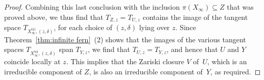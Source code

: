 \documentclass[11pt]{article}
\theoremstyle{definition}
\newcommand\tri{\mathrm{tri}}
\begin{document}
\begin{proof}
Combining this last conclusion with the inclusion
$\pi(X_{\infty}) \subseteq Z$ that was proved above,
we thus find that $T_{Z,z} = T_{U,z}$ contains
the image of the tangent space $T_{X^{\tri}_{\infty},(z,\delta)}$,
for each
choice of $(z,\delta)$ lying over $z$.
Since Theorem~\ref{thm:infinite fern}~(2) shows that
the images of the various tangent spaces $T_{X^{\tri}_{\infty},(z,\delta)}$
span $T_{Y,z}$,
we find that $T_{U,z} = T_{Y,z}$, and hence that $U$ and $Y$ coincide
locally at $z$. This implies that the Zariski closure
$V$ of~$U$, which is an irreducible component of $Z$, is also
an irreducible component of~$Y$, as required.
\end{proof}

\vspace*{-1\baselineskip}\enlargethispage{.5\baselineskip}%

\end{document}
